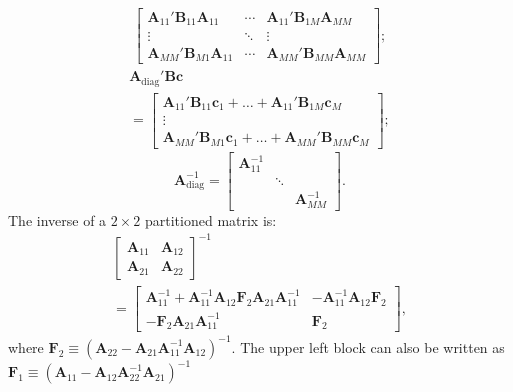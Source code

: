 \documentclass[8pt,letterpaper, landscape]{extarticle} %
\newcommand{\mA}{\ensuremath{\mathbf{A}}}
\newcommand{\mB}{\ensuremath{\mathbf{B}}}
\newcommand{\mc}{\ensuremath{\mathbf{c}}}
\begin{document}
\begin{multicols}{3}
\begin{description}
\begin{multline*}
\begin{bmatrix}
\mA_{11}' \mB_{11} \mA_{11} & \cdots & \mA_{11}' \mB_{1M} \mA_{MM} \\ 
\vdots & \ddots & \vdots \\
\mA_{MM}' \mB_{M1} \mA_{11} & \cdots & \mA_{MM}' \mB_{MM} \mA_{MM} 
\end{bmatrix};
\end{multline*}
%
\begin{multline*}
\mA_{\text{diag}}' \mB \mc
\\ =
\begin{bmatrix}
\mA_{11}' \mB_{11} \mc_{1} + \dotsc + \mA_{11}' \mB_{1M} \mc_{M} \\ 
\vdots \\
\mA_{MM}' \mB_{M1} \mc_{1} + \dotsc + \mA_{MM}' \mB_{MM} \mc_{M}
\end{bmatrix};
\end{multline*}
%
$$ \mA_{\text{diag}}^{-1} = \begin{bmatrix}
\mA_{11}^{-1} &  &  \\ 
 & \ddots &  \\
 &  & \mA_{MM}^{-1}
\end{bmatrix}. $$
The inverse of a $ 2 \times 2 $ partitioned matrix is:
%
\begin{multline*}
\begin{bmatrix}
\mA_{11} & \mA_{12}  \\ 
\mA_{21} & \mA_{22}
\end{bmatrix}^{-1}
\\ =
\begin{bmatrix}
\mA_{11}^{-1} + \mA_{11}^{-1} \mA_{12} \mathbf{F}_2 \mA_{21} \mA_{11}^{-1} & -\mA_{11}^{-1} \mA_{12} \mathbf{F}_2  \\ 
- \mathbf{F}_2 \mA_{21} \mA_{11}^{-1} & \mathbf{F}_2
\end{bmatrix},
\end{multline*}
where $ \mathbf{F}_2 \equiv (\mA_{22} - \mA_{21} \mA_{11}^{-1} \mA_{12})^{-1} $. The upper left block can also be written as $ \mathbf{F}_1 \equiv (\mA_{11} - \mA_{12} \mA_{22}^{-1} \mA_{21})^{-1} $


\end{description}
\end{multicols}
\end{document}
